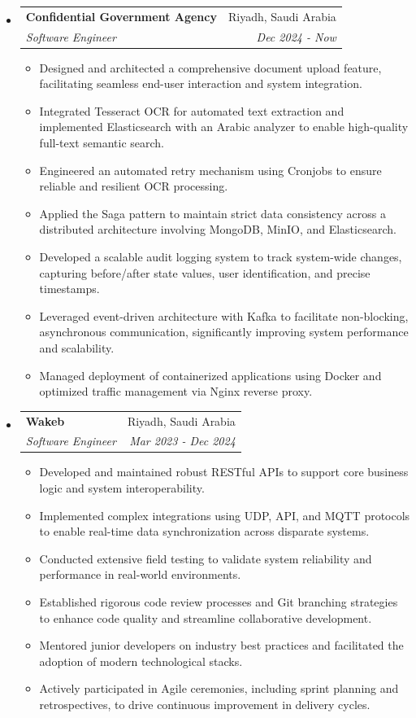 \documentclass[letterpaper,11pt]{article}
\makeatletter
\newcommand{\resitem}[1]{\item #1 \vspace{-2pt}}
\newcommand{\ressubheading}[4]{
    \begin{tabular*}{6.5in}{p{4.8in}@{\extracolsep{\fill}}r}
            \textbf{#1} & #2 \\
            \textit{#3} & \textit{#4} \\
    \end{tabular*}\vspace{-8pt}}
\makeatother
\begin{document}
      \begin{itemize}
        \item \ressubheading{Confidential Government Agency}{Riyadh, Saudi Arabia}{Software Engineer}{Dec 2024 - Now}
        \begin{itemize}
            \resitem{Designed and architected a comprehensive document upload feature, facilitating seamless end-user interaction and system integration.}
            \resitem{Integrated Tesseract OCR for automated text extraction and implemented Elasticsearch with an Arabic analyzer to enable high-quality full-text semantic search.}
            \resitem{Engineered an automated retry mechanism using Cronjobs to ensure reliable and resilient OCR processing.}
            \resitem{Applied the Saga pattern to maintain strict data consistency across a distributed architecture involving MongoDB, MinIO, and Elasticsearch.}
            \resitem{Developed a scalable audit logging system to track system-wide changes, capturing before/after state values, user identification, and precise timestamps.}
            \resitem{Leveraged event-driven architecture with Kafka to facilitate non-blocking, asynchronous communication, significantly improving system performance and scalability.}
            \resitem{Managed deployment of containerized applications using Docker and optimized traffic management via Nginx reverse proxy.}
        \end{itemize}
        \item \ressubheading{Wakeb}{Riyadh, Saudi Arabia}{Software Engineer}{Mar 2023 - Dec 2024}
        \begin{itemize}
            \resitem{Developed and maintained robust RESTful APIs to support core business logic and system interoperability.}
            \resitem{Implemented complex integrations using UDP, API, and MQTT protocols to enable real-time data synchronization across disparate systems.}
            \resitem{Conducted extensive field testing to validate system reliability and performance in real-world environments.}
            \resitem{Established rigorous code review processes and Git branching strategies to enhance code quality and streamline collaborative development.}
            \resitem{Mentored junior developers on industry best practices and facilitated the adoption of modern technological stacks.}
            \resitem{Actively participated in Agile ceremonies, including sprint planning and retrospectives, to drive continuous improvement in delivery cycles.}
        \end{itemize}
      \end{itemize}
\end{document}
